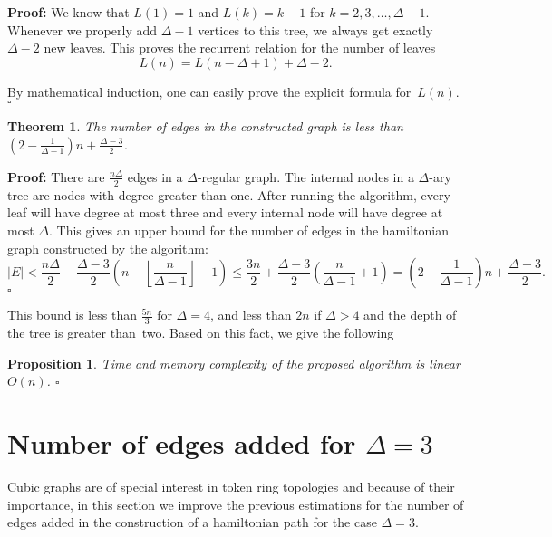 \documentclass[10pt,a4paper]{article}
\newtheorem{te}{Theorem}[section]
\newtheorem{pro}{Proposition}[section]
\newenvironment{proof} {\par \noindent \textbf{Proof: }}{\QED\par \bigskip \par}
\newcommand{\QED}{\hfill$\square$}
\newcommand{\rz}{\vspace{0.1cm}}
\begin{document}
\begin{proof}
    We know that $L (1) = 1$ and $L (k) = k - 1$ for $k = 2, 3,
    \ldots, \Delta - 1$. Whenever we properly add $\Delta - 1$ vertices
    to this tree, we always get exactly $\Delta - 2$ new leaves. This
    proves the recurrent relation for the number of leaves
    $$L (n) = L (n - \Delta + 1) + \Delta - 2.$$

    By mathematical induction, one can easily prove the explicit formula
    for~$L (n)$.
\end{proof}


\begin{te}
    The number of edges in the constructed graph is less than
    $(2 - \frac{1}{\Delta - 1}) n + \frac {\Delta - 3}{2}$.
\end{te}

\begin{proof}
    There are $\frac{n\Delta}{2}$ edges in a $\Delta$-regular
    graph. The internal nodes in a $\Delta$-ary tree are nodes with degree greater than one.
    After running the algorithm, every leaf will have degree at most
    three and every internal node will have degree at most $\Delta$.
    This gives an upper bound for the number of edges in the hamiltonian graph
    constructed by the algorithm:
$$
    |E| < \frac{n \Delta}{2} - \frac {\Delta - 3}{2} \left
    ( n - \left \lfloor \frac{n}{ \Delta - 1} \right \rfloor - 1 \right
    ) \leqslant \frac{3n}{2} + \frac {\Delta - 3}{2} \left (\frac
    {n}{\Delta - 1} + 1 \right ) = \left(2 - \frac{1}{\Delta -
    1} \right) n + \frac{\Delta - 3}{2}.
$$
\end{proof}

This bound is less than $\frac{5n}{3}$ for $\Delta = 4$, and less
than $2n$ if $\Delta > 4$ and the depth of the tree is greater
than~two. Based on this fact, we give the following

\begin{pro}
Time and memory complexity of the proposed algorithm is linear $O
(n)$. \QED
\end{pro}



\section{Number of edges added for $\Delta=3$}

Cubic graphs are of special interest in token ring topologies and
because of their importance, in this section we improve the previous
estimations for the number of edges added in the construction of a
hamiltonian path for the case $\Delta = 3$. \rz
\end{document}
